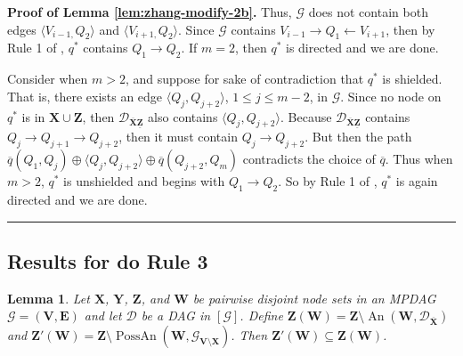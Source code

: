 \documentclass[11pt]{article}
\DeclareMathOperator{\An}{An}
\DeclareMathOperator{\PossAn}{PossAn}
\newcommand{\BlackBox}{\rule{1.5ex}{1.5ex}}  %
\newtheorem{lemma}[theorem]{Lemma}
\newcommand{\mb}[1]{\mathbf{#1}}
\newcommand{\g}[1][G]{\mathcal{#1}}
\newenvironment{proofof}[1][]{\noindent \textbf{Proof of #1.}}{\hfill\BlackBox}
\begin{document}
\begin{proofof}[Lemma \ref{lem:zhang-modify-2b}]
    Thus, $\g$ does not contain both edges $\langle V_{i-1,} Q_2 \rangle$ and $\langle V_{i+1,} Q_2 \rangle$. Since $\g$ contains $V_{i-1} \to Q_1 \gets V_{i+1}$, then by Rule 1 of \cite{meek1995causal}, $q^*$ contains $Q_1 \to Q_2$. If $m=2$, then $q^*$ is directed and we are done.

    Consider when $m>2$, and suppose for sake of contradiction that $q^*$ is shielded. That is, there exists an edge $\langle Q_j, Q_{j+2} \rangle$, $1 \le j \le m-2$, in $\g$. Since no node on $q^*$ is in $\mb{X} \cup \mb{Z}$, then $\g[D]_{\overline{\mb{X}}\underline{\mb{Z}}}$ also contains $\langle Q_j, Q_{j+2} \rangle$. Because $\g[D]_{\overline{\mb{X}}\underline{\mb{Z}}}$ contains $Q_j \to Q_{j+1} \to Q_{j+2}$, then it must contain $Q_j \to Q_{j+2}$. But then the path $\overline{q}(Q_1, Q_j) \oplus \langle Q_j, Q_{j+2} \rangle \oplus \overline{q}(Q_{j+2}, Q_m)$ contradicts the choice of $\overline{q}$. Thus when $m>2$, $q^*$ is unshielded and begins with $Q_1 \to Q_2$. So by Rule 1 of \cite{meek1995causal}, $q^*$ is again directed and we are done.
\end{proofof}






\subsection{Results for do Rule 3}


\begin{lemma}
\label{lem:zhang-modify-3a}
    Let $\mb{X}$, $\mb{Y}$, $\mb{Z}$, and $\mb{W}$ be pairwise disjoint node sets in an MPDAG $\g = (\mb{V,E})$ and let $\g[D]$ be a DAG in $[\g]$. Define $\mb{Z(W)} = \mb{Z} \setminus \An(\mb{W}, \g[D]_{\overline{\mb{X}}})$ and $\mb{Z'(W)} = \mb{Z} \setminus \PossAn(\mb{W}, \g_{\mb{V \setminus X}})$. Then $\mb{Z'(W)} \subseteq \mb{Z(W)}$.
\end{lemma}
\end{document}
